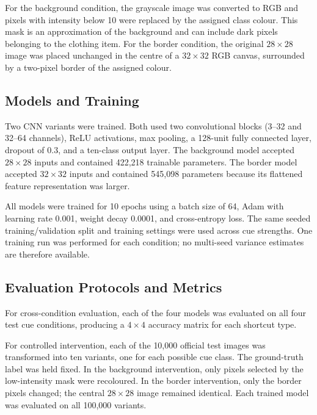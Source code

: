 \documentclass[conference]{IEEEtran}
\begin{document}
For the background condition, the grayscale image was converted to RGB and pixels with intensity below 10 were replaced by the assigned class colour. This mask is an approximation of the background and can include dark pixels belonging to the clothing item. For the border condition, the original $28\times28$ image was placed unchanged in the centre of a $32\times32$ RGB canvas, surrounded by a two-pixel border of the assigned colour.

\subsection{Models and Training}
Two CNN variants were trained. Both used two convolutional blocks (3--32 and 32--64 channels), ReLU activations, max pooling, a 128-unit fully connected layer, dropout of 0.3, and a ten-class output layer. The background model accepted $28\times28$ inputs and contained 422,218 trainable parameters. The border model accepted $32\times32$ inputs and contained 545,098 parameters because its flattened feature representation was larger.

All models were trained for 10 epochs using a batch size of 64, Adam with learning rate 0.001, weight decay 0.0001, and cross-entropy loss. The same seeded training/validation split and training settings were used across cue strengths. One training run was performed for each condition; no multi-seed variance estimates are therefore available.

\subsection{Evaluation Protocols and Metrics}
For cross-condition evaluation, each of the four models was evaluated on all four test cue conditions, producing a $4\times4$ accuracy matrix for each shortcut type.

For controlled intervention, each of the 10,000 official test images was transformed into ten variants, one for each possible cue class. The ground-truth label was held fixed. In the background intervention, only pixels selected by the low-intensity mask were recoloured. In the border intervention, only the border pixels changed; the central $28\times28$ image remained identical. Each trained model was evaluated on all 100,000 variants.
\end{document}
